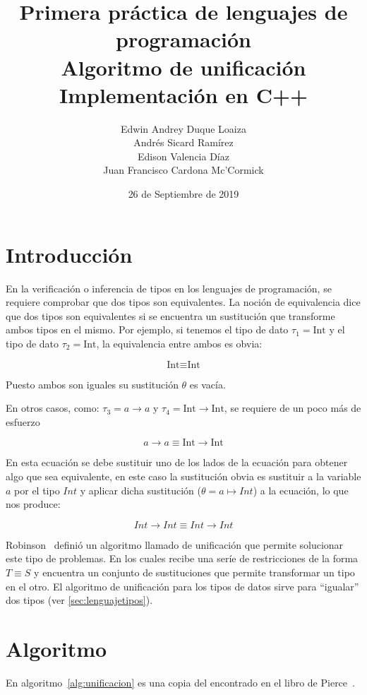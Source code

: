 \documentclass{article}
\title{Primera práctica de lenguajes de programación\\Algoritmo de unificación\\Implementación en C++}
\date{26 de Septiembre de 2019}
\author{Edwin Andrey Duque Loaiza\\Andrés Sicard Ramírez\\Edison Valencia Díaz\\Juan Francisco Cardona Mc'Cormick}
\begin{document}
\maketitle{}

\section{Introducción}
\label{sec:Introduccion}

En la verificación o inferencia de tipos en los lenguajes de
programación, se requiere comprobar que dos tipos son equivalentes. La
noción de equivalencia dice que dos tipos son equivalentes si se
encuentra un sustitución que transforme ambos tipos en el mismo. Por
ejemplo, si tenemos el tipo de dato $\tau_1 = \text{Int}$ y el tipo de
dato $\tau_2 = \text{Int}$, la equivalencia entre ambos es obvia:

\[
  \text{Int} \equiv \text{Int}
\]

Puesto ambos son iguales su sustitución $\theta$ es vacía.

En otros casos, como: $\tau_3 = a \to a$ y $\tau_4 = \text{Int}
\to \text{Int}$, se requiere de un poco más de esfuerzo

\[
  a \to a \equiv \text{Int} \to \text{Int}
\]

En esta ecuación se debe sustituir uno de los lados de la ecuación
para obtener algo que sea equivalente, en este caso la sustitución
obvia es sustituir a la variable $a$ por el tipo $Int$ y aplicar dicha
sustitución ($\theta = a \mapsto Int$) a la ecuación, lo que nos
produce:

\[
  Int \to Int \equiv Int \to Int
\]

Robinson~\cite{robinson} definió un algoritmo llamado de unificación
que permite solucionar este tipo de problemas. En los cuales
recibe una seríe de restricciones de la forma $T \equiv S$ y encuentra
un conjunto de sustituciones que permite transformar un tipo en
el otro. El algoritmo de unificación para los tipos de datos sirve para ``igualar'' dos tipos
(ver \ref{sec:lenguajetipos}).

\section{Algoritmo}\label{sec:algoritmo}

En algoritmo~\ref{alg:unificacion} es una copia del encontrado en el
libro de Pierce~\cite{pierce}.
\end{document}
